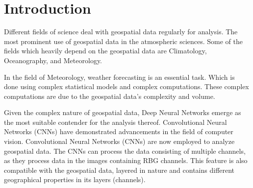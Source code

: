 \clearpage
\cleardoublepage

\chapter{Introduction}

Different fields of science deal with geospatial data regularly for analysis.
The most prominent use of geospatial data in the atmospheric sciences. Some of the fields
which heavily depend on the geospatial data are Climatology, Oceanography, and Meteorology.

In the field of Meteorology, weather forecasting is an essential task. Which is done using complex statistical models and complex computations.
These complex computations are due to the geospatial data's
complexity and volume.

Given the complex nature of geospatial data,
Deep Neural Networks emerge as the most suitable contender for the analysis thereof. Convolutional Neural Networks (CNNs) have demonstrated advancements in the field of computer
vision. Convolutional Neural Networks (CNNs) are now employed to analyze geospatial data. The CNNs can process the data consisting of multiple channels, as they process
data in the images containing RBG channels. This feature is also compatible with the geospatial data, layered in nature and contains different geographical properties in its layers
(channels).

